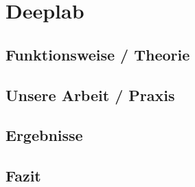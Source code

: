 \chapter{Deeplab}
\label{ch:deeplab}



\section{Funktionsweise / Theorie}


\section{Unsere Arbeit / Praxis}


\section{Ergebnisse}


\section{Fazit}

